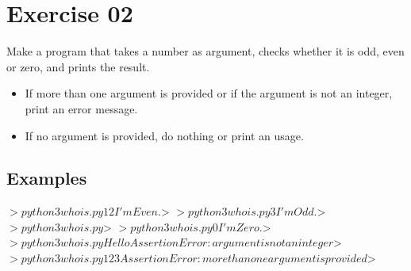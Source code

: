 \chapter{Exercise 02}
\makeheaderfilesforbidden
Make a program that takes a number as argument, checks whether it is odd, even or zero, and prints the result.
\begin{itemize}
	\item If more than one argument is provided or if the argument is not an integer, print an error message.
	\item If no argument is provided, do nothing or print an usage.
\end{itemize}

\section*{Examples}
\begin{42console}
$> python3 whois.py 12
I'm Even.
$>
$> python3 whois.py 3
I'm Odd.
$>
$> python3 whois.py
$>
$> python3 whois.py 0
I'm Zero.
$>
$> python3 whois.py Hello
AssertionError: argument is not an integer
$>
$> python3 whois.py 12 3
AssertionError: more than one argument is provided
$>
\end{42console}

